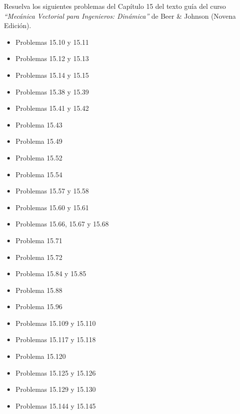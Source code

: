 \documentclass[ a4paper, twoside, 11pt]{article}
\begin{document}
\begin{problem}
Resuelva los siguientes problemas del Cap\'itulo 15 del texto gu\'ia del curso \emph{``Mec\'anica Vectorial para Ingenieros: Din\'amica''} de Beer \& Johnson (Novena Edici\'on). 
\begin{itemize}
\item Problemas 15.10 y 15.11
\item Problemas 15.12 y 15.13
\item Problemas 15.14 y 15.15
\item Problemas 15.38 y 15.39
\item Problemas 15.41 y 15.42
\item Problema 15.43
\item Problema 15.49
\item Problema 15.52
\item Problema 15.54
\item Problemas 15.57 y 15.58
\item Problemas 15.60 y 15.61
\item Problemas 15.66, 15.67 y 15.68
\item Problema 15.71
\item Problema 15.72
\item Problema 15.84 y 15.85
\item Problema 15.88
\item Problema 15.96
\item Problemas 15.109 y 15.110
\item Problemas 15.117 y 15.118
\item Problema 15.120
\item Problemas 15.125 y 15.126
\item Problemas 15.129 y 15.130
\item Problemas 15.144 y 15.145
\end{itemize}

\end{problem}
\fullskip
\end{document}
